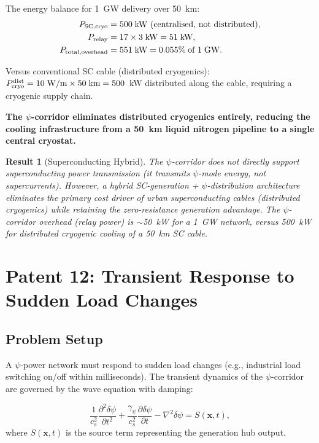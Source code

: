 \documentclass[aps,prd,twocolumn,superscriptaddress,nofootinbib]{revtex4-2}
\newtheorem{result}{Result}
\begin{document}
The energy balance for 1~GW delivery over 50~km:
\begin{align}
P_{\rm SC,cryo} &= 500\;\text{kW (centralised, not distributed)}, \\
P_{\rm relay} &= 17\times3\;\text{kW} = 51\;\text{kW}, \\
P_{\rm total,overhead} &= 551\;\text{kW} = 0.055\%\;\text{of }1\;\text{GW}.
\end{align}

Versus conventional SC cable (distributed cryogenics):
$P_{\rm cryo}^{\rm dist} = 10\;\text{W/m}\times50\;\text{km} = 500$~kW
distributed along the cable, requiring a cryogenic supply chain.

\textbf{The $\psi$-corridor eliminates distributed cryogenics entirely,
reducing the cooling infrastructure from a 50~km liquid nitrogen
pipeline to a single central cryostat.}

\begin{result}[Superconducting Hybrid]
The $\psi$-corridor does not directly support superconducting power
transmission (it transmits $\psi$-mode energy, not supercurrents).
However, a hybrid SC-generation + $\psi$-distribution architecture
eliminates the primary cost driver of urban superconducting cables
(distributed cryogenics) while retaining the zero-resistance
generation advantage. The $\psi$-corridor overhead (relay power) is
$\sim$50~kW for a 1~GW network, versus 500~kW for distributed
cryogenic cooling of a 50~km SC cable.
\end{result}

\section{Patent 12: Transient Response to Sudden Load Changes}
\label{sec:transient}

\subsection{Problem Setup}

A $\psi$-power network must respond to sudden load changes (e.g.,
industrial load switching on/off within milliseconds). The transient
dynamics of the $\psi$-corridor are governed by the wave equation
with damping:

\begin{equation}
\frac{1}{c_s^2}\frac{\partial^2\delta\psi}{\partial t^2}
+ \frac{\gamma_\psi}{c_s^2}\frac{\partial\delta\psi}{\partial t}
- \nabla^2\delta\psi = S(\mathbf{x},t),
\label{eq:transient_wave}
\end{equation}
where $S(\mathbf{x},t)$ is the source term representing the
generation hub output.
\end{document}
